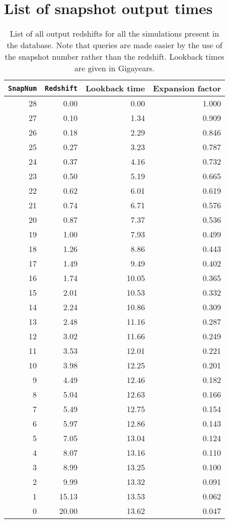 \section{List of snapshot output times} 
\label{appendix_snapshot}
\setcounter{table}{0}
\begin{table}[h]
\caption{List of all output redshifts for all the simulations present in the
  database. Note that \sql queries are made easier by the use of the snapshot number
  rather than the redshift. Lookback times are given in Gigayears.}
\label{table:snapshot_list}
\begin{center}
\footnotesize
\renewcommand{\arraystretch}{1.5}
\begin{tabular}{rrrr}
\hline
{\tt SnapNum} & {\tt Redshift} & Lookback  time & Expansion factor \\
\hline\hline
28 &  0.00 & 0.00  & 1.000  \\ 
27 &  0.10 & 1.34  & 0.909  \\
26 &  0.18 & 2.29  & 0.846  \\
25 &  0.27 & 3.23  & 0.787  \\
24 &  0.37 & 4.16  & 0.732  \\
23 &  0.50 & 5.19  & 0.665  \\
22 &  0.62 & 6.01  & 0.619  \\
21 &  0.74 & 6.71  & 0.576  \\
20 &  0.87 & 7.37  & 0.536  \\
19 &  1.00 & 7.93  & 0.499  \\
18 &  1.26 & 8.86  & 0.443  \\
17 &  1.49 & 9.49  & 0.402  \\
16 &  1.74 & 10.05 & 0.365  \\
15 &  2.01 & 10.53 & 0.332  \\
14 &  2.24 & 10.86 & 0.309  \\
13 &  2.48 & 11.16 & 0.287  \\
12 &  3.02 & 11.66 & 0.249  \\
11 &  3.53 & 12.01 & 0.221  \\
10 &  3.98 & 12.25 & 0.201  \\
9  &  4.49 & 12.46 & 0.182  \\
8  &  5.04 & 12.63 & 0.166  \\
7  &  5.49 & 12.75 & 0.154  \\
6  &  5.97 & 12.86 & 0.143  \\
5  &  7.05 & 13.04 & 0.124  \\
4  &  8.07 & 13.16 & 0.110  \\
3  &  8.99 & 13.25 & 0.100  \\
2  &  9.99 & 13.32 & 0.091  \\
1  &  15.13& 13.53 & 0.062  \\
0  &  20.00& 13.62 & 0.047  \\


\hline
\end{tabular}


\end{center}
\end{table}
